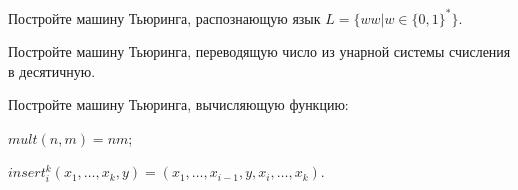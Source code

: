 \documentclass[12pt, a4paper]{article}
\begin{document}
\begin{problemList}
\smallskip

{Постройте машину Тьюринга, распознающую язык $L=\{ww|w\in\{0, 1\}^*\}$.}

\bigskip

{Постройте машину Тьюринга, переводящую число из унарной системы счисления в десятичную.}

\bigskip

{Постройте машину Тьюринга, вычисляющую функцию:}
{%
\begin{belarusianEnumerate}
    \item $mult(n, m)=nm$;
    \item $insert_i^k(x_1, \ldots, x_k, y)=(x_1, \ldots, x_{i-1}, y, x_i, \ldots, x_k)$.
\end{belarusianEnumerate}
}

\end{problemList}
\end{document}

